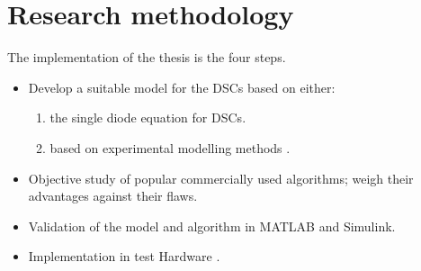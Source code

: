 \section{Research methodology}
The implementation of the thesis is the four steps. 
\begin{itemize}
\item Develop a suitable model for the \ac{DSCs} based on either:
	\begin{enumerate}
		\item the single diode equation for \ac{DSCs}.
		\item based on experimental modelling methods .
	\end{enumerate}
\item Objective study of popular commercially used algorithms;  weigh their advantages against their flaws.
\item Validation of the model and algorithm in MATLAB{\textregistered} and Simulink{\textregistered}.
\item Implementation in test Hardware .
\end {itemize}